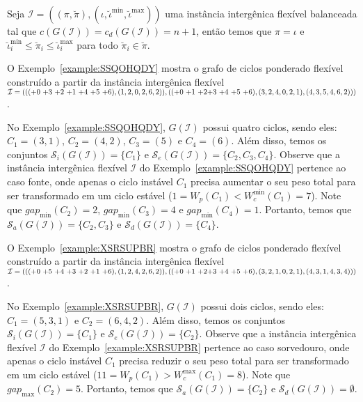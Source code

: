 \begin{remark}\label{remark:HLVDQLCE}
Seja $\mathcal{I} = ((\pi,\breve\pi),(\iota,\breve\iota^{\min},\breve\iota^{\max}))$ uma instância intergênica flexível balanceada tal que $c(G(\mathcal{I})) = c_d(G(\mathcal{I})) = n+1$, então temos que $\pi = \iota$ e $\breve\iota^{\min}_i \le \breve\pi_i \le \breve\iota^{\max}_i$ para todo $\breve\pi_i \in \breve\pi$.
\end{remark}

O Exemplo~\ref{example:SSQOHQDY} mostra o grafo de ciclos ponderado flexível construído a partir da instância intergênica flexível $\mathcal{I} = ((({+0}~{+3}~{+2}~{+1}~{+4}~{+5}~{+6}),(1,2,0,2,6,2)),(({+0}~{+1}~{+2}\break{+3}~{+4}~{+5}~{+6}),(3,2,4,0,2,1),(4,3,5,4,6,2)))$.



No Exemplo~\ref{example:SSQOHQDY}, $G(\mathcal{I})$ possui quatro ciclos, sendo eles: $C_1 = (3,1)$, $C_2 = (4,2)$, $C_3 = (5)$ e $C_4=(6)$. Além disso, temos os conjuntos $\mathcal{S}_i(G(\mathcal{I})) = \{C_1\}$ e $\mathcal{S}_e(G(\mathcal{I})) = \{C_2,C_3,C_4\}$. Observe que a instância intergênica flexível $\mathcal{I}$ do Exemplo~\ref{example:SSQOHQDY} pertence ao caso fonte, onde apenas o ciclo instável $C_1$ precisa aumentar o seu peso total para ser transformado em um ciclo estável ($1 = W_p(C_1) < W^{\min}_c(C_1) = 7$). Note que $gap_{\min}(C_2) = 2$, $gap_{\min}(C_3) = 4$ e $gap_{\min}(C_4) = 1$. Portanto, temos que $\mathcal{S}_a(G(\mathcal{I})) = \{C_2, C_3\}$ e $\mathcal{S}_d(G(\mathcal{I})) = \{C_4\}$.

O Exemplo~\ref{example:XSRSUPBR} mostra o grafo de ciclos ponderado flexível construído a partir da instância intergênica flexível $\mathcal{I} = ((({+0}~{+5}~{+4}~{+3}~{+2}~{+1}~{+6}),(1,2,4,2,6,2)),(({+0}~{+1}~{+2}\break{+3}~{+4}~{+5}~{+6}),(3,2,1,0,2,1),(4,3,1,4,3,4)))$.



No Exemplo~\ref{example:XSRSUPBR}, $G(\mathcal{I})$ possui dois ciclos, sendo eles: $C_1 = (5,3,1)$ e $C_2 = (6,4,2)$. Além disso, temos os conjuntos $\mathcal{S}_i(G(\mathcal{I})) = \{C_1\}$ e $\mathcal{S}_e(G(\mathcal{I})) = \{C_2\}$. Observe que a instância intergênica flexível $\mathcal{I}$ do Exemplo~\ref{example:XSRSUPBR} pertence ao caso sorvedouro, onde apenas o ciclo instável $C_1$ precisa reduzir o seu peso total para ser transformado em um ciclo estável ($11 = W_p(C_1) > W^{\max}_c(C_1) = 8$). Note que $gap_{\max}(C_2) = 5$. Portanto, temos que $\mathcal{S}_a(G(\mathcal{I})) = \{C_2\}$ e $\mathcal{S}_d(G(\mathcal{I})) = \emptyset$.